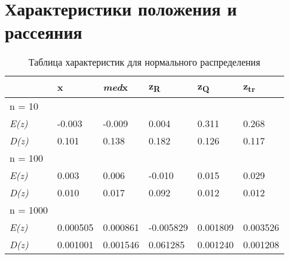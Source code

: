 \section{Характеристики положения и рассеяния}
\begin{table}[H]
\centering
    \begin{tabular}{|l|l|l|l|l|l|}
    \hline
         &  x &   \textit{med}x   &   z\textsubscript{R}  &   z\textsubscript{Q}  &   z\textsubscript{tr}\\ \hline \hline
         n = 10& & & & & \\ \hline
         \textit{E(z)} & -0.003 & -0.009 & 0.004 & 0.311 & 0.268 \\ \hline
         \textit{D(z)} & 0.101       &       0.138       &       0.182     &        0.126      &        0.117 \\ \hline
       \hline
         n = 100& & & & & \\ \hline
         \textit{E(z)} & 0.003       &        0.006      &       -0.010       &        0.015       &        0.029  \\ \hline
         \textit{D(z)} &  0.010       &        0.017       &        0.092      &        0.012       &        0.012  \\ \hline
        \hline
         n = 1000& & & & & \\ \hline
         \textit{E(z)} &  0.000505       &       0.000861       &       -0.005829       &        0.001809       &       0.003526  \\ \hline
         \textit{D(z)} & 0.001001       &       0.001546       &        0.061285       &        0.001240        &       0.001208 \\ \hline
    \end{tabular}
     \caption{Таблица характеристик для нормального распределения}
    \label{tab:my_label}
\end{table}

